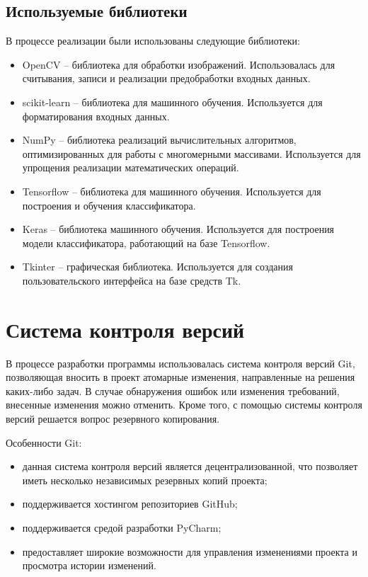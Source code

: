 \subsection{Используемые библиотеки}

В процессе реализации были использованы следующие библиотеки:

\begin{itemize}
	\item OpenCV -- библиотека для обработки изображений. Использовалась для считывания, записи и реализации предобработки входных данных.
	\item scikit-learn -- библиотека для машинного обучения. Используется для форматирования входных данных.
	\item NumPy -- библиотека реализаций вычислительных алгоритмов, оптимизированных для работы с многомерными массивами. Используется для упрощения реализации математических операций.
	\item Tensorflow -- библиотека для машинного обучения. Используется для построения и обучения классификатора.
	\item Keras -- библиотека машинного обучения. Используется для построения модели классификатора, работающий на базе Tensorflow.
	\item Tkinter -- графическая библиотека. Используется для создания пользовательского интерфейса на базе средств Tk.
\end{itemize}

\section{Система контроля версий}

В процессе разработки программы использовалась система контроля версий Git, позволяющая вносить в проект атомарные изменения, направленные на решения каких-либо задач. В случае обнаружения ошибок или изменения требований, внесенные изменения можно отменить. Кроме того, с помощью системы контроля версий решается вопрос резервного копирования.

Особенности Git:

\begin{itemize}
	\item данная система контроля версий является децентрализованной, что позволяет иметь несколько независимых резервных копий проекта;
	\item поддерживается хостингом репозиториев GitHub;
	\item поддерживается средой разработки PyCharm;
	\item предоставляет широкие возможности для управления изменениями проекта и просмотра истории изменений.
\end{itemize}

